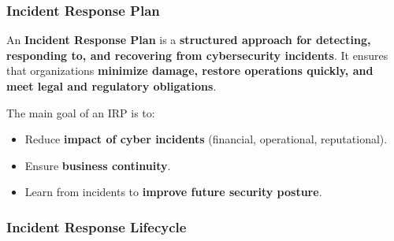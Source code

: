 \subsubsection{Incident Response Plan}

\indent 

An \textbf{Incident Response Plan} is a \textbf{structured approach for detecting, responding to, and recovering from cybersecurity incidents}. It ensures that organizations \textbf{minimize damage, restore operations quickly, and meet legal and regulatory obligations}.

The main goal of an IRP is to:

\begin{itemize}
    \item Reduce \textbf{impact of cyber incidents} (financial, operational, reputational).
    \item Ensure \textbf{business continuity}.
    \item Learn from incidents to \textbf{improve future security posture}.
\end{itemize}

\subsubsection{Incident Response Lifecycle}

\indent 

